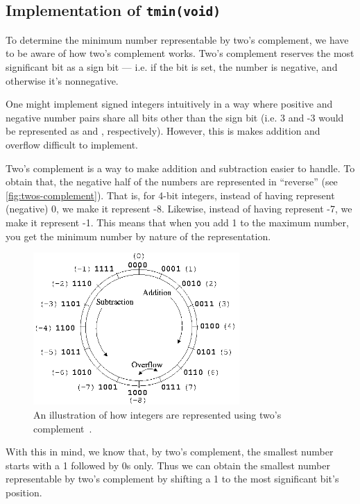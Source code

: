 \subsection{Implementation of \texttt{tmin(void)}}

To determine the minimum number representable by two's complement, we have to be aware of how two's complement works. Two's complement reserves the most significant bit as a sign bit --- i.e. if the bit is set, the number is negative, and otherwise it's nonnegative.

One might implement signed integers intuitively in a way where positive and negative number pairs share all bits other than the sign bit (i.e. 3 and -3 would be represented as  and , respectively). However, this is makes addition and overflow difficult to implement.

Two's complement is a way to make addition and subtraction easier to handle. To obtain that, the negative half of the numbers are represented in ``reverse'' (see \autoref{fig:twos-complement}). That is, for 4-bit integers, instead of having  represent (negative) 0, we make it represent -8. Likewise, instead of having  represent -7, we make it represent -1. This means that when you add 1 to the maximum number, you get the minimum number by nature of the representation.

\begin{figure}[H]
  \centering
  \includegraphics[width=0.7\textwidth]{figures/twos-complement.png}
  \caption[nothing]{An illustration of how integers are represented using two's complement~\cite{twoscomplement}.}
  \label{fig:twos-complement}
\end{figure}

With this in mind, we know that, by two's complement, the smallest number starts with a 1 followed by 0s only. Thus we can obtain the smallest number representable by two's complement by shifting a 1 to the most significant bit's position.

